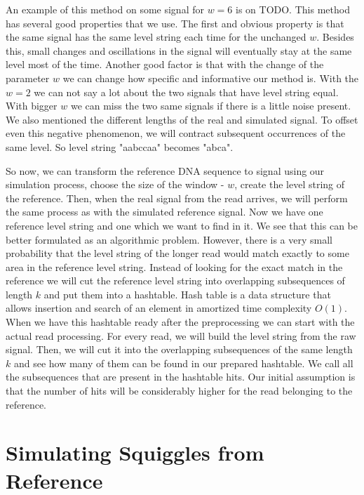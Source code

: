 An example of this method on some signal for $w=6$ is on TODO. This method has several good
properties that we use. The first and obvious property is that the same signal has the
same level string each time for the unchanged $w$. Besides this, small changes and
oscillations in the signal will eventually stay at the same level most of the time.
Another good factor is that with the change of the parameter $w$ we can change how specific
and informative our method is. With the $w=2$ we can not say a lot about the two signals
that have level string equal. With bigger $w$ we can miss the two same signals
if there is a little noise present. We also mentioned the different lengths of
the real and simulated signal. To offset even this negative phenomenon, we will contract
subsequent occurrences of the same level. So level string "aabccaa" becomes "abca".

So now, we can transform the reference DNA sequence to signal using our simulation
process, choose the size of the window - $w$, create the level string of the reference.
Then, when the real signal from the read arrives, we will perform the same process
as with the simulated reference signal. Now we have one reference level string and
one which we want to find in it. We see that this can be better formulated as an
algorithmic problem. However, there is a very small probability that the level string
of the longer read would match exactly to some area in the reference level string.
Instead of looking for the exact match in the reference we will cut the reference
level string into overlapping subsequences of length $k$ and put them into a hashtable.
Hash table is a data structure that allows insertion and search of an element in
amortized time complexity $O(1)$. When we have this hashtable ready after the
preprocessing we can start with the actual read processing. For every read, we will
build the level string from the raw signal. Then, we will cut it into the overlapping
subsequences of the same length $k$ and see how many of them can be found in our
prepared hashtable. We call all the subsequences that are present in the hashtable
hits. Our initial assumption is that the number of hits will be considerably higher
for the read belonging to the reference.

\section{Simulating Squiggles from Reference}

